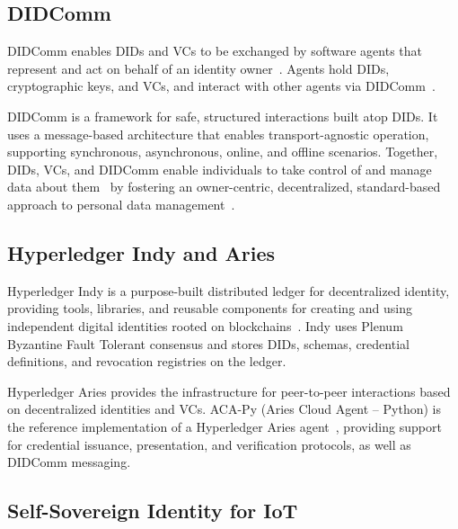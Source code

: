 \subsection{DIDComm}
\label{subsec:didcomm}

\ac{DIDComm} enables \acp{DID} and \acp{VC} to be exchanged by software agents that represent and act on behalf of an identity owner~\cite{hardman:agents:2019}.
Agents hold \acp{DID}, cryptographic keys, and \acp{VC}, and interact with other agents via \ac{DIDComm}~\cite{hardman:didcomm:2022}.

\ac{DIDComm} is a framework for safe, structured interactions built atop \acp{DID}.
It uses a message-based architecture that enables transport-agnostic operation, supporting synchronous, asynchronous, online, and offline scenarios.
Together, \acp{DID}, \acp{VC}, and \ac{DIDComm} enable individuals to take control of and manage data about them~\cite{langford:poikola:janssen:etal:2022} by fostering an owner-centric, decentralized, standard-based approach to personal data management~\cite{fedrecheski:rabaey:costa:etal:2020}.

\subsection{Hyperledger Indy and Aries}
\label{subsec:indy-aries}

Hyperledger Indy is a purpose-built distributed ledger for decentralized identity, providing tools, libraries, and reusable components for creating and using independent digital identities rooted on blockchains~\cite{preukschat:reed:2021}.
Indy uses Plenum Byzantine Fault Tolerant consensus and stores \acp{DID}, schemas, credential definitions, and revocation registries on the ledger.

Hyperledger Aries provides the infrastructure for peer-to-peer interactions based on decentralized identities and \acp{VC}.
ACA-Py (Aries Cloud Agent -- Python) is the reference implementation of a Hyperledger Aries agent~\cite{aries:acapy}, providing support for credential issuance, presentation, and verification protocols, as well as \ac{DIDComm} messaging.

\subsection{Self-Sovereign Identity for IoT}
\label{subsec:ssi-iot}

